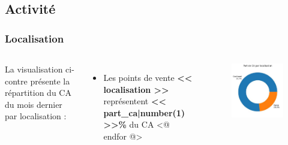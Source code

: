 \documentclass{beamer}
\begin{document}
    \subsection{Activité}

    \begin{frame}[plain]
        \tiny
        \frametitle{Localisation}

        \begin{columns}
                La visualisation ci-contre présente la répartition du CA du mois dernier par localisation :

                \begin{itemize}
                    <@ for localisation, part_ca in ca_par_localisation.items() @>
                        \item{Les points de vente \textbf{<< localisation >>} représentent \textbf{<< part_ca|number(1) >>\%} du CA}
                    <@ endfor @>
                \end{itemize}

                \centering

                \begin{figure}[h]
                    \centering
                    \includegraphics[width=1\textwidth]{assets/ca_par_localisation}
                \end{figure}
        \end{columns}


\end{frame}
\end{document}
